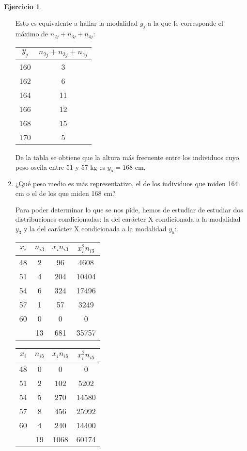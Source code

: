 \documentclass[a4paper, 12pt]{article}
\theoremstyle{definition}
\newtheorem{ej}{Ejercicio}
\begin{document}
\begin{ej}
\begin{enumerate}[label=\alph*)]
Esto es equivalente a hallar la modalidad $y_j$ a la que le corresponde el máximo de $n_{2j}+n_{3j}+n_{4j}$:

\begin{center}
\begin{tabular}{c|c}
	\(y_j\) & \(n_{2j}+n_{3j}+n_{4j}\)\\
	\hline
	160 & 3 \\
	162 & 6\\
	164 & 11\\
	166 & 12\\
	168 & 15\\
	170 & 5\\
\end{tabular}
\end{center}

De la tabla se obtiene que la altura más frecuente entre los individuos cuyo peso oscila entre 51 y 57 kg es $y_5 = 168$ cm.

\item ¿Qué peso medio es más representativo, el de los individuos que miden 164 cm o el de los
que miden 168 cm?

Para poder determinar lo que se nos pide, hemos de estudiar de estudiar dos distribuciones condicionadas: la del carácter X condicionada a la modalidad $y_3$ y la del carácter X condicionada a la modalidad $y_5$:

\begin{center}
\begin{tabular}{c|c|c|c}
	\(x_i\) & \(n_{i3}\) & \(x_i n_{i3}\) & \(x_{i}^{2} n_{i3}\)\\
	\hline
	48 & 2 & 96 & 4608\\
	51 & 4 & 204 & 10404\\
	54 & 6 & 324 & 17496\\
	57 & 1 & 57 & 3249\\
	60 & 0 & 0 & 0\\
	\hline
	& 13 & 681 & 35757\\
\end{tabular}
\qquad
\begin{tabular}{c|c|c|c}
	\(x_i\) & \(n_{i5}\) & \(x_i n_{i5}\) & \(x_{i}^{2} n_{i5}\)\\
	\hline
	48 & 0 & 0 & 0\\
	51 & 2 & 102 & 5202\\
	54 & 5 & 270 & 14580\\
	57 & 8 & 456 & 25992\\
	60 & 4 & 240 & 14400\\
	\hline
	& 19 & 1068 & 60174\\
\end{tabular}
\end{center}


\end{enumerate}
\end{ej}
\end{document}
